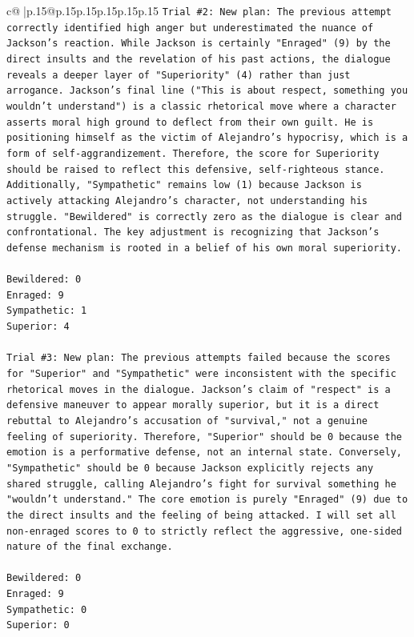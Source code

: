 \documentclass{article}
\begin{document}
{\begin{supertabular}{c@{$\;$}|p{.15\linewidth}@{}p{.15\linewidth}p{.15\linewidth}p{.15\linewidth}p{.15\linewidth}p{.15\linewidth}}
{{{\texttt{Trial \#2: New plan: The previous attempt correctly identified high anger but underestimated the nuance of Jackson's reaction. While Jackson is certainly "Enraged" (9) by the direct insults and the revelation of his past actions, the dialogue reveals a deeper layer of "Superiority" (4) rather than just arrogance. Jackson's final line ("This is about respect, something you wouldn't understand") is a classic rhetorical move where a character asserts moral high ground to deflect from their own guilt. He is positioning himself as the victim of Alejandro's hypocrisy, which is a form of self{-}aggrandizement. Therefore, the score for Superiority should be raised to reflect this defensive, self{-}righteous stance. Additionally, "Sympathetic" remains low (1) because Jackson is actively attacking Alejandro's character, not understanding his struggle. "Bewildered" is correctly zero as the dialogue is clear and confrontational. The key adjustment is recognizing that Jackson's defense mechanism is rooted in a belief of his own moral superiority.} \\
\\ 
\texttt{Bewildered: 0} \\
\texttt{Enraged: 9} \\
\texttt{Sympathetic: 1} \\
\texttt{Superior: 4} \\
\\ 
\texttt{Trial \#3: New plan: The previous attempts failed because the scores for "Superior" and "Sympathetic" were inconsistent with the specific rhetorical moves in the dialogue. Jackson's claim of "respect" is a defensive maneuver to appear morally superior, but it is a direct rebuttal to Alejandro's accusation of "survival," not a genuine feeling of superiority. Therefore, "Superior" should be 0 because the emotion is a performative defense, not an internal state. Conversely, "Sympathetic" should be 0 because Jackson explicitly rejects any shared struggle, calling Alejandro's fight for survival something he "wouldn't understand." The core emotion is purely "Enraged" (9) due to the direct insults and the feeling of being attacked. I will set all non{-}enraged scores to 0 to strictly reflect the aggressive, one{-}sided nature of the final exchange.} \\
\\ 
\texttt{Bewildered: 0} \\
\texttt{Enraged: 9} \\
\texttt{Sympathetic: 0} \\
\texttt{Superior: 0} \\
}}}
\end{supertabular}}
\end{document}
